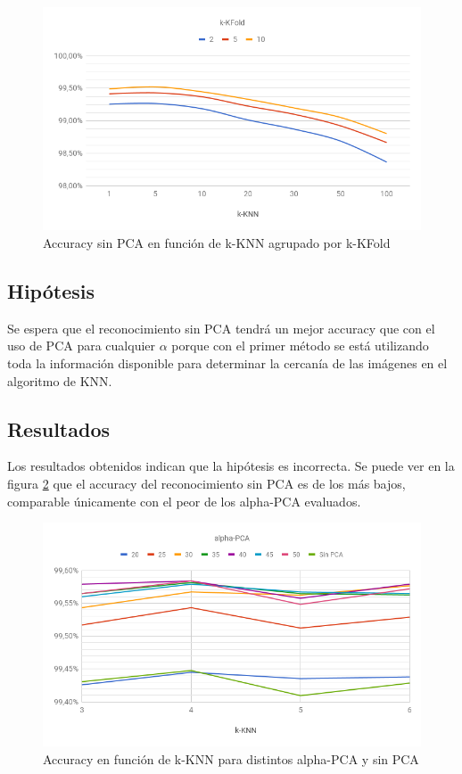 \begin{figure}[H]
	\centering
	\includegraphics[width=\textwidth]{graficos/cv1_sin_pca_accuracy.png}
	\caption{Accuracy sin PCA en función de k-KNN agrupado por k-KFold}
	\label{fig:cv1_sin_pca_accuracy}
\end{figure}

\subsection{Hipótesis}

Se espera que el reconocimiento sin PCA tendrá un mejor accuracy que con el uso de PCA para cualquier $\alpha$ porque con el primer método se está utilizando toda la información disponible para determinar la cercanía de las imágenes en el algoritmo de KNN.

\subsection{Resultados}

Los resultados obtenidos indican que la hipótesis es incorrecta. Se puede ver en la figura \ref{fig:cv_vs} que el accuracy del reconocimiento sin PCA es de los más bajos, comparable únicamente con el peor de los alpha-PCA evaluados.

\begin{figure}[H]
    \centering
    \includegraphics[width=\textwidth]{graficos/cv_vs.png}
    \caption{Accuracy en función de k-KNN para distintos alpha-PCA y sin PCA}
    \label{fig:cv_vs}
\end{figure}

